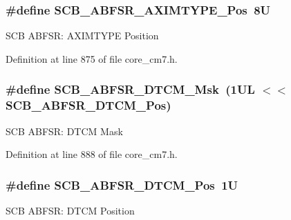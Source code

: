 \subsubsection[{\texorpdfstring{S\+C\+B\+\_\+\+A\+B\+F\+S\+R\+\_\+\+A\+X\+I\+M\+T\+Y\+P\+E\+\_\+\+Pos}{SCB_ABFSR_AXIMTYPE_Pos}}]{\setlength{\rightskip}{0pt plus 5cm}\#define S\+C\+B\+\_\+\+A\+B\+F\+S\+R\+\_\+\+A\+X\+I\+M\+T\+Y\+P\+E\+\_\+\+Pos~8U}\hypertarget{group___c_m_s_i_s___s_c_b_gad89888a5399f2a229270d6dc9a8eaa85}{}\label{group___c_m_s_i_s___s_c_b_gad89888a5399f2a229270d6dc9a8eaa85}
S\+CB A\+B\+F\+SR\+: A\+X\+I\+M\+T\+Y\+PE Position 

Definition at line 875 of file core\+\_\+cm7.\+h.

\subsubsection[{\texorpdfstring{S\+C\+B\+\_\+\+A\+B\+F\+S\+R\+\_\+\+D\+T\+C\+M\+\_\+\+Msk}{SCB_ABFSR_DTCM_Msk}}]{\setlength{\rightskip}{0pt plus 5cm}\#define S\+C\+B\+\_\+\+A\+B\+F\+S\+R\+\_\+\+D\+T\+C\+M\+\_\+\+Msk~(1\+U\+L $<$$<$ S\+C\+B\+\_\+\+A\+B\+F\+S\+R\+\_\+\+D\+T\+C\+M\+\_\+\+Pos)}\hypertarget{group___c_m_s_i_s___s_c_b_ga0f48b9b3b5e79c83383ff9506a75f423}{}\label{group___c_m_s_i_s___s_c_b_ga0f48b9b3b5e79c83383ff9506a75f423}
S\+CB A\+B\+F\+SR\+: D\+T\+CM Mask 

Definition at line 888 of file core\+\_\+cm7.\+h.

\subsubsection[{\texorpdfstring{S\+C\+B\+\_\+\+A\+B\+F\+S\+R\+\_\+\+D\+T\+C\+M\+\_\+\+Pos}{SCB_ABFSR_DTCM_Pos}}]{\setlength{\rightskip}{0pt plus 5cm}\#define S\+C\+B\+\_\+\+A\+B\+F\+S\+R\+\_\+\+D\+T\+C\+M\+\_\+\+Pos~1U}\hypertarget{group___c_m_s_i_s___s_c_b_ga46e22bfb92f4344807714dfa987b7cf3}{}\label{group___c_m_s_i_s___s_c_b_ga46e22bfb92f4344807714dfa987b7cf3}
S\+CB A\+B\+F\+SR\+: D\+T\+CM Position 

